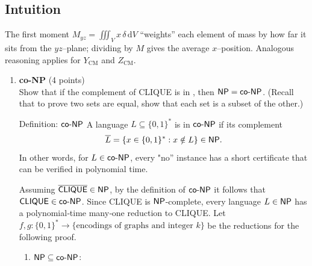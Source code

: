 \subsection*{Intuition}
The first moment $M_{yz} = \iiint_V x\,\delta\,\mathrm{d}V$ “weights” each element of mass by how far it sits from the $yz$–plane; dividing by $M$ gives the average $x$–position.  Analogous reasoning applies for $Y_{\mathrm{CM}}$ and $Z_{\mathrm{CM}}$.



\newpage



\begin{enumerate}
    \item \textbf{co-NP} (4 points)\\
    Show that if the complement of \textsf{CLIQUE} is in \NP, then \(\textsf{NP} = \textsf{co-NP}\). 
    (Recall that to prove two sets are equal, show that each set is a subset of the other.)
    \begin{define}{Definition: $\textsf{co-NP}$}
    A language $L\subseteq\{0,1\}^*$ is in $\textsf{co-NP}$ if its complement
    \[
    \overline{L} = \{ x\in\{0,1\}^* : x\notin L \} \in \textsf{NP}.
    \]
    In other words, for $L \in \textsf{co-NP}$, every "no'' instance has a short certificate that can be verified in polynomial time.
    \end{define}
    \begin{prove}
        Assuming \(\overline{\textsf{CLIQUE}}\in\textsf{NP}\), by 
        the definition of \(\textsf{co-NP}\) it follows that \(\textsf{CLIQUE}\in\textsf{co-NP}\). 
        Since \textsf{CLIQUE} is \(\textsf{NP}\)\nobreakdash-complete, every language 
        \(L\in\textsf{NP}\) has a polynomial‑time many‑one reduction to \textsf{CLIQUE}. 
        Let $f, g \colon \{0,1\}^* \to \{\text{encodings of graphs and integer }k\}$ be
        the reductions for the following proof.
        \begin{enumerate}
            \item \(\textsf{NP} \subseteq \textsf{co-NP}\):\\

\end{enumerate}
\end{prove}
\end{enumerate}
